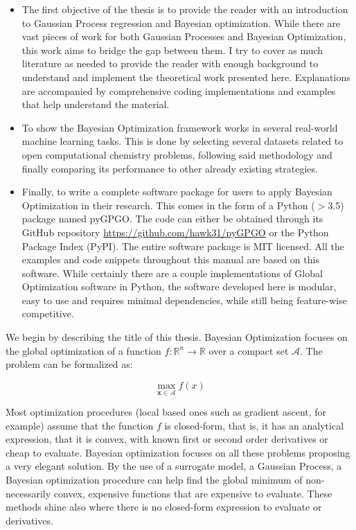 \documentclass[10pt,a4paper,twoside]{book}
\begin{document}
\begin{itemize}
\item The first objective of the thesis is to provide the reader with an introduction to Gaussian Process regression and Bayesian optimization. While there are vast pieces of work for both Gaussian Processes and Bayesian Optimization, this work aims to bridge the gap between them. I try to cover as much literature as needed to provide the reader with enough background to understand and implement the theoretical work presented here. Explanations are accompanied by comprehensive coding implementations and examples that help understand the material.
\item To show the Bayesian Optimization framework works in several real-world machine learning tasks. This is done by selecting several datasets related to open computational chemistry problems, following said methodology and finally comparing its performance to other already existing strategies. 
\item Finally, to write a complete software package for users to apply Bayesian Optimization in their research. This comes in the form of a Python ($>$3.5) package named pyGPGO. The code can either be obtained through its GitHub repository \url{https://github.com/hawk31/pyGPGO} or the Python Package Index (PyPI). The entire software package is MIT licensed. All the examples and code snippets throughout this manual are based on this software. While certainly there are a couple implementations of Global Optimization software in Python, the software developed here is modular, easy to use and requires minimal dependencies, while still being feature-wise competitive.
\end{itemize}

We begin by describing the title of this thesis. Bayesian Optimization focuses on the global optimization of a function $f:\mathbb{R}^n \rightarrow \mathbb{R}$ over a compact set $\mathcal{A}$. The problem can be formalized as:

\begin{equation}
\max_{\boldsymbol{x}\in \mathcal{A}} f(x)
\end{equation}

Most optimization procedures (local based ones such as gradient ascent, for example) assume that the function $f$ is closed-form, that is, it has an analytical expression, that it is convex, with known first or second order derivatives or cheap to evaluate. Bayesian optimization focuses on all these problems proposing a very elegant solution. By the use of a surrogate model, a Gaussian Process, a Bayesian optimization procedure can help find the global minimum of non-necessarily convex, expensive functions that are expensive to evaluate. These methods shine also where there is no closed-form expression to evaluate or derivatives.\\
\end{document}
